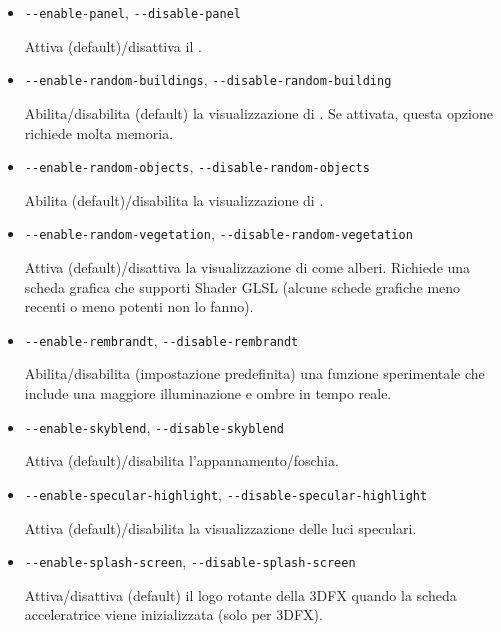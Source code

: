 \begin{itemize}
{\begin{itemize}
  Attiva/disattiva (default) il puntatore del . Utile in modalit\`{a} a schermo intero per le vecchie schede basate su Voodoo.

  \item{\texttt{-$ $-enable-panel}, \texttt{-$ $-disable-panel}}

  Attiva (default)/disattiva il .

  \item{\texttt{-$ $-enable-random-buildings}, \texttt{-$ $-disable-random-building}}

  Abilita/disabilita (default) la visualizzazione di .
  Se attivata, questa opzione richiede molta memoria.

  \item{\texttt{-$ $-enable-random-objects}, \texttt{-$ $-disable-random-objects}}

  Abilita (default)/disabilita la visualizzazione di .

  \item{\texttt{-$ $-enable-random-vegetation}, \texttt{-$ $-disable-random-vegetation}}

  Attiva (default)/disattiva la visualizzazione di  come alberi.
  Richiede una scheda grafica che supporti Shader GLSL (alcune schede grafiche meno
  recenti o meno potenti non lo fanno).

  \item{\texttt{-$ $-enable-rembrandt}, \texttt{-$ $-disable-rembrandt}}

  Abilita/disabilita (impostazione predefinita) una funzione sperimentale che
  include una maggiore illuminazione e ombre in tempo reale.

  \item{\texttt{-$ $-enable-skyblend}, \texttt{-$ $-disable-skyblend}}

  Attiva (default)/disabilita l'appannamento/foschia.

  \item{\texttt{-$ $-enable-specular-highlight}, \texttt{-$ $-disable-specular-highlight}}

  Attiva (default)/disabilita la visualizzazione delle luci speculari.

  \item{\texttt{-$ $-enable-splash-screen}, \texttt{-$ $-disable-splash-screen}}

  Attiva/disattiva (default) il logo rotante della 3DFX quando la scheda acceleratrice viene inizializzata (solo per 3DFX).


\end{itemize}}
\end{itemize}
